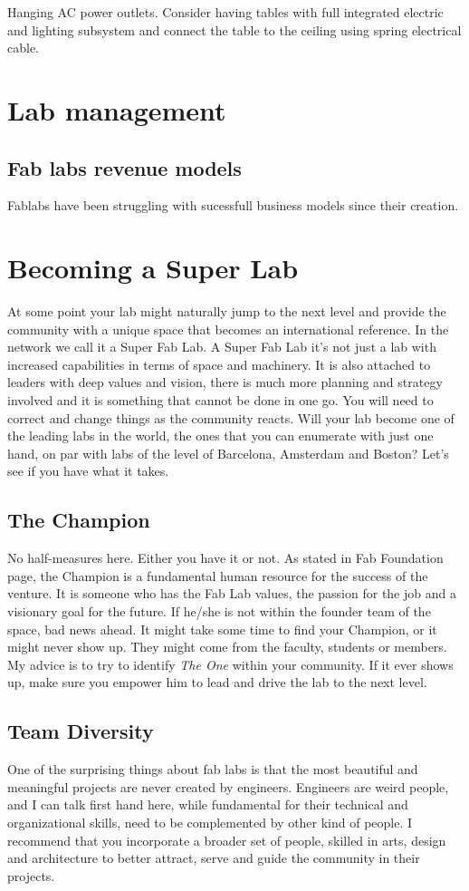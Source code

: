 \documentclass[a4paper,12pt,titlepage]{article}
\begin{document}
Hanging AC power outlets. Consider having tables with full integrated electric and lighting subsystem and connect the table to the ceiling using spring electrical cable.

\section{Lab management}

\subsection{Fab labs revenue models}
Fablabs have been struggling with sucessfull business models since their creation.\\

\section{Becoming a Super Lab}
At some point your lab might naturally jump to the next level and provide the community with a unique space
that becomes an international reference. In the network we call it a Super Fab Lab. A
Super Fab Lab it's not just a lab with increased capabilities in terms of space and
machinery. It is also attached to leaders with  deep values and vision, there is much more planning and strategy involved and it is something that
cannot be done in one go. You will need to correct and change things as the
community reacts. Will your lab become one of the
leading labs in the world, the ones that you can enumerate with just one hand, on par
with labs of the level of Barcelona, Amsterdam and Boston? Let's see if you have what it takes.
\subsection{The Champion}
No half-measures here. Either you have it or not. As stated in Fab Foundation page, the Champion is a fundamental human resource for the success of the
venture. It is someone who has the Fab Lab values, the passion for the job and a visionary goal for
the future. If he/she is not within the founder team of the space, bad news ahead. It might take some time to find your Champion, or it might never show up. They might
come from the faculty, students or members. My advice is to try to identify \textit{The One} within your community. If it
ever shows up, make sure you empower him to lead and drive the lab to the next level.

\subsection{Team Diversity}
One of the surprising things about fab labs is that the most beautiful and meaningful projects are never created by engineers. Engineers are weird people, and I can talk first hand here, while fundamental for their technical and organizational skills, need to be complemented by other kind of people. I
recommend that you incorporate a broader set of people, skilled in arts, design and
architecture to better attract, serve and guide the community in their projects. 
\end{document}
